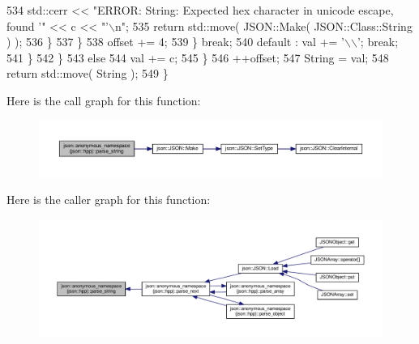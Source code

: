 \begin{DoxyCode}
534                             std::cerr << \textcolor{stringliteral}{"ERROR: String: Expected hex character in unicode escape, found '"}
       << c << \textcolor{stringliteral}{"'\(\backslash\)n"};
535                             \textcolor{keywordflow}{return} std::move( JSON::Make( JSON::Class::String ) );
536                         \}
537                     \}
538                     offset += 4;
539                 \} \textcolor{keywordflow}{break};
540                 default  : val += \textcolor{charliteral}{'\(\backslash\)\(\backslash\)'}; \textcolor{keywordflow}{break};
541                 \}
542             \}
543             \textcolor{keywordflow}{else}
544                 val += c;
545         \}
546         ++offset;
547         String = val;
548         \textcolor{keywordflow}{return} std::move( String );
549     \}
\end{DoxyCode}
Here is the call graph for this function\+:
\nopagebreak
\begin{figure}[H]
\begin{center}
\leavevmode
\includegraphics[width=350pt]{namespacejson_1_1anonymous__namespace_02json_8hpp_03_a274c7a1f9001093d6b093abb5481122b_cgraph}
\end{center}
\end{figure}
Here is the caller graph for this function\+:
\nopagebreak
\begin{figure}[H]
\begin{center}
\leavevmode
\includegraphics[width=350pt]{namespacejson_1_1anonymous__namespace_02json_8hpp_03_a274c7a1f9001093d6b093abb5481122b_icgraph}
\end{center}
\end{figure}
